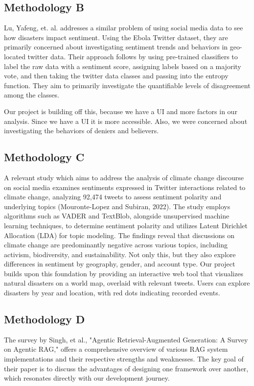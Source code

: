 \documentclass[pdflatex,sn-mathphys-num]{sn-jnl}%
\theoremstyle{thmstyleone}%
\theoremstyle{thmstyletwo}%
\theoremstyle{thmstylethree}%
\begin{document}
\subsection{Methodology B}\label{subsec12}
Lu, Yafeng, et. al. addresses a similar problem of using social media data to see how disasters impact sentiment. Using the Ebola Twitter dataset, they are primarily concerned about investigating sentiment trends and behaviors in geo-located twitter data. Their approach follows by using pre-trained classifiers to label the raw data with a sentiment score, assigning labels based on a majority vote, and then taking the twitter data classes and passing into the entropy function. They aim to primarily investigate the quantifiable levels of disagreement among the classes.

Our project is building off this, because we have a UI and more factors in our analysis. Since we have a UI it is more accessible. Also, we were concerned about investigating the behaviors of deniers and believers.

\subsection{Methodology C}\label{subsec13}
A relevant study which aims to address the analysis of climate change discourse on social media examines sentiments expressed in Twitter interactions related to climate change, analyzing 92,474 tweets to assess sentiment polarity and underlying topics (Mouronte-Lopez and Subiran, 2022). The study employs algorithms such as VADER and TextBlob, alongside unsupervised machine learning techniques, to determine sentiment polarity and utilizes Latent Dirichlet Allocation (LDA) for topic modeling. The findings reveal that discussions on climate change are predominantly negative across various topics, including activism, biodiversity, and sustainability. Not only this, but they also explore differences in sentiment by geography, gender, and account type. Our project builds upon this foundation by providing an interactive web tool that visualizes natural disasters on a world map, overlaid with relevant tweets. Users can explore disasters by year and location, with red dots indicating recorded events.

\subsection{Methodology D}\label{subsec14}
The survey by Singh, et al., "Agentic Retrieval-Augmented Generation: A Survey on Agentic RAG," offers a comprehensive overview of various RAG system implementations and their respective strengths and weaknesses. The key goal of their paper is to discuss the advantages of designing one framework over another, which resonates directly with our development journey.
\end{document}
